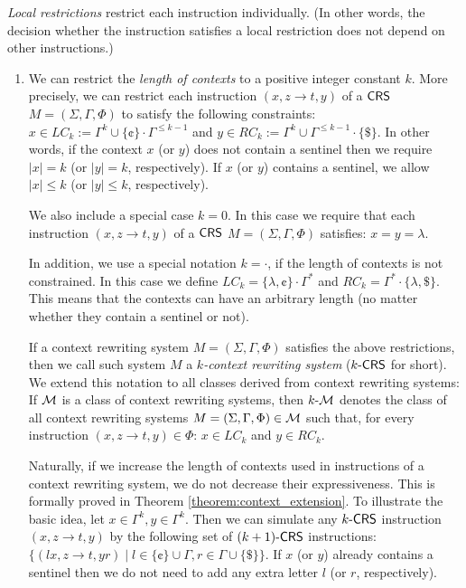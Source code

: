 \begin{definition}\label{definition:restrictions}
\emph{Local restrictions} restrict each instruction individually. (In other words, the decision whether the instruction satisfies a local restriction does not depend on other instructions.)
\begin{enumerate}
\item\label{restriction:contexts}
We can restrict the \emph{length of contexts} to a positive integer constant $k$. More precisely, we can restrict each instruction $(x, z \to t, y)$ of a $\CRS$ $M=(\Sigma, \Gamma, \Phi)$ to satisfy the following constraints: $x \in LC_k := \Gamma^k \cup \{\cent\}\cdot\Gamma^{\le k-1}$ and $y \in RC_k := \Gamma^k \cup \Gamma^{\le k-1}\cdot\{\$\}$. In other words, if the context $x$ (or $y$) does not contain a sentinel then we require $|x| = k$ (or $|y| = k$, respectively). If $x$ (or $y$) contains a sentinel, we allow $|x| \le k$ (or $|y| \le k$, respectively).

We also include a special case $k = 0$. In this case we require that each instruction $(x, z \to t, y)$ of a $\CRS$ $M=(\Sigma, \Gamma, \Phi)$ satisfies: $x = y = \lambda$.

In addition, we use a special notation $k = \cdot$, if the length of contexts is not constrained. In this case we define $LC_k = \{\lambda, \cent\} \cdot \Gamma^*$ and $RC_k = \Gamma^* \cdot \{\lambda, \$\}$. This means that the contexts can have an arbitrary length (no matter whether they contain a sentinel or not).

If a context rewriting system $M=(\Sigma, \Gamma, \Phi)$ satisfies the above restrictions, then we call such system $M$ a \emph{$k$-context rewriting system} (\index{$\kCRS$}$\kCRS$ for short). We extend this notation to all classes derived from context rewriting systems: If $\calM$ is a class of context rewriting systems, then $\kcalM$ denotes the class of all context rewriting systems $M=(\Sigma, \Gamma, \Phi) \in \calM$ such that, for every instruction $(x, z \to t, y) \in \Phi$: $x \in LC_k$ and $y \in RC_k$.

Naturally, if we increase the length of contexts used in instructions of a context rewriting system, we do not decrease their expressiveness. This is formally proved in Theorem \ref{theorem:context_extension}. To illustrate the basic idea, let $x \in \Gamma^k, y \in \Gamma^k$. Then we can simulate any $\kCRS$ instruction $(x, z \to t, y)$ by the following set of $\kCRS[(k+1)]$ instructions: $\{ (lx, z \to t, yr) \mid l \in \{\cent\} \cup \Gamma, r \in \Gamma \cup \{\$\} \}$. If $x$ (or $y$) already contains a sentinel then we do not need to add any extra letter $l$ (or $r$, respectively).


\end{enumerate}
\end{definition}
